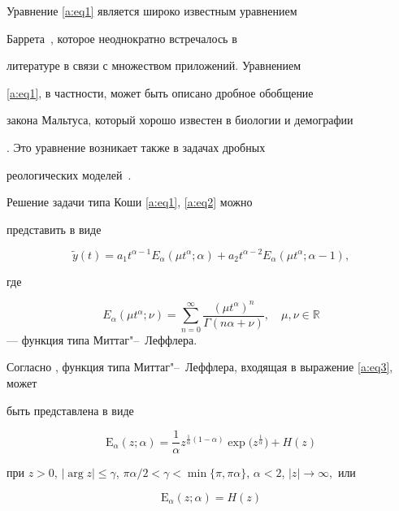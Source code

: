 Уравнение \eqref{a:eq1} является широко известным уравнением

Баррета~\cite{v:Barrett}, которое неоднократно встречалось в

литературе в связи с множеством приложений. Уравнением

\eqref{a:eq1}, в частности, может быть описано дробное обобщение

закона Мальтуса, который хорошо известен в биологии и демографии

\cite{v:N1, v:VS}. Это уравнение возникает также в задачах дробных

реологических моделей~\cite{v:R_O_Y, v:Ogor}.



Решение задачи типа Коши \eqref{a:eq1}, \eqref{a:eq2} можно

представить в виде \cite{v:Barrett, v:N}

\begin{equation}\label{a:eq3}

\tilde{y}(t)=a_1 t^{\alpha-1} E_{\alpha}(\mu

t^{\alpha};\alpha)+a_2 t^{\alpha-2} E_{\alpha}(\mu

t^{\alpha};\alpha-1),

\end{equation}

где 

$$

E_{\alpha}(\mu t^{\alpha};\nu)=\sum \limits_{n=0}^{\infty}

\frac{(\mu t^{\alpha})^{n}}{\Gamma(n\alpha+\nu)}, \quad \mu, \nu \in \mathbb{R}$$  --- функция типа Миттаг"--~Леффлера. 

Согласно \cite{v:D}, функция типа Миттаг"--~Леффлера, входящая в вы\-ра\-же\-ние \eqref{a:eq3}, может

быть представлена в виде

\begin{equation}\label{a:eq5}

\mbox{E}_{\alpha}(z;\alpha)=\dfrac{1}{\alpha}z^{\frac{1}{\alpha}\left(1-\alpha \right)}\exp \big(z^{\frac{1}{\alpha}}\big) + H(z)

\end{equation}

при $z>0$, $| \arg z|\leq \gamma$, ${\pi \alpha}/{2}<\gamma< \min \{\pi, \pi \alpha\}$, $\alpha <

2$, $ |z| \rightarrow \infty,$ или

\begin{equation}\label{a:eq6}

\mbox{E}_{\alpha}(z;\alpha)= H(z)

\end{equation}

